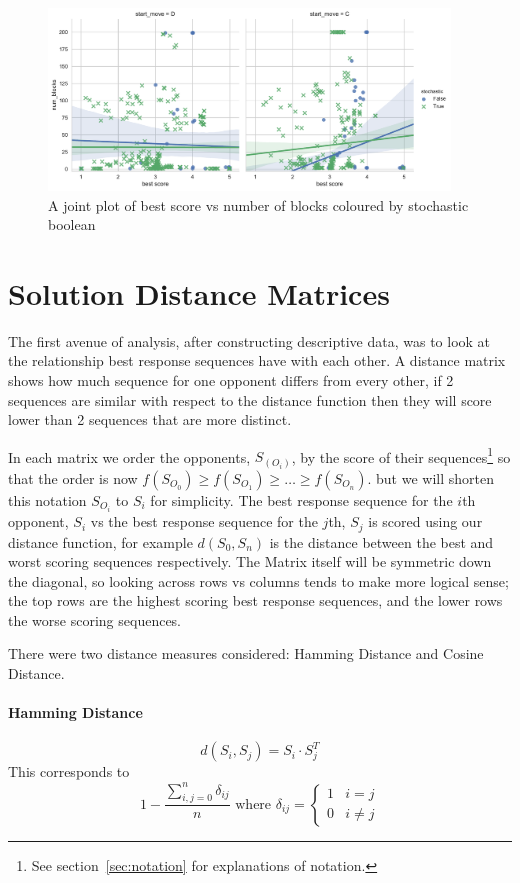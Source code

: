 \begin{figure}[ht]
    \includegraphics[width=0.95\textwidth, center]{./img/descriptive/cor_plot.pdf}
    \caption{A joint plot of best score vs number of blocks coloured by stochastic boolean}\label{fig:cor_plot}
\end{figure}

\section{Solution Distance Matrices}\label{sec:distance_matracies}
The first avenue of analysis, after constructing descriptive data, was to look at the relationship best response sequences have with each other.
A distance matrix shows how much  sequence for one opponent differs from every other, if 2 sequences are similar with respect to the distance function then they will score lower than 2 sequences that are more distinct.

In each matrix we order the opponents, $S_(O_i)$, by the score of their sequences\footnote{See section~\ref{sec:notation} for explanations of notation.} so that the order is now $f(S_{O_0}) \ge f(S_{O_1}) \ge \ldots \ge f(S_{O_n})$. but we will shorten this notation $S_{O_i}$ to $S_{i}$ for simplicity.
The best response sequence for the $i$th opponent, $S_i$ vs the best response sequence for the $j$th, $S_j$ is scored using our distance function, for example $d(S_0,S_n)$ is the distance between the best and worst scoring sequences respectively.
The Matrix itself will be symmetric down the diagonal, so looking across rows vs columns tends to make more logical sense; the top rows are the highest scoring best response sequences, and the lower rows the worse scoring sequences.

There were two distance measures considered: Hamming Distance and Cosine Distance.

\paragraph{Hamming Distance}\cite{norouzi2012hamming}
$$d(S_i,S_j) = S_i \cdot S_j^T $$
This corresponds to 
$$ 1-\frac{\sum^n_{i,j=0}\delta_{ij}}{n}\text{ where } \delta_{ij} = \begin{cases} 
    1 & i=j \\
    0 & i\ne j 
\end{cases} $$

